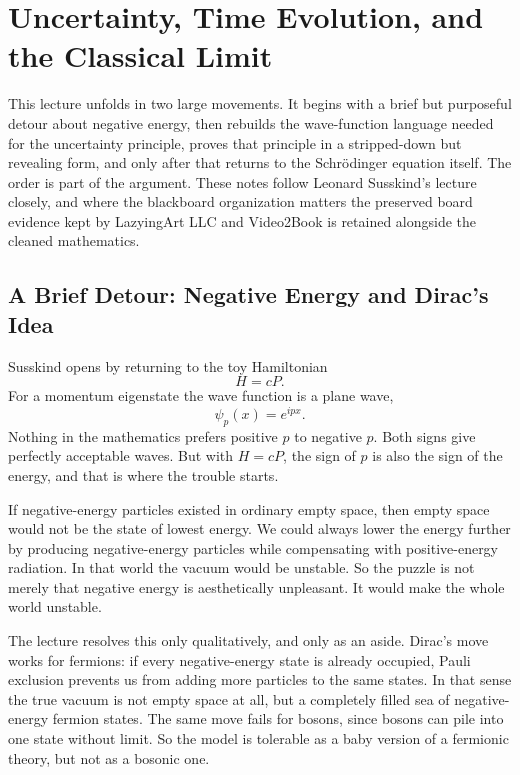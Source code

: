 \chapter{Uncertainty, Time Evolution, and the Classical Limit}

This lecture unfolds in two large movements. It begins with a brief but purposeful detour about negative energy, then rebuilds the wave-function language needed for the uncertainty principle, proves that principle in a stripped-down but revealing form, and only after that returns to the Schr\"odinger equation itself. The order is part of the argument. These notes follow Leonard Susskind's lecture closely, and where the blackboard organization matters the preserved board evidence kept by LazyingArt LLC and Video2Book is retained alongside the cleaned mathematics.

\section{A Brief Detour: Negative Energy and Dirac's Idea}

Susskind opens by returning to the toy Hamiltonian
\begin{equation}
H=cP.
\end{equation}
For a momentum eigenstate the wave function is a plane wave,
\begin{equation}
\psi_p(x)=e^{ipx}.
\end{equation}
Nothing in the mathematics prefers positive \(p\) to negative \(p\). Both signs give perfectly acceptable waves. But with \(H=cP\), the sign of \(p\) is also the sign of the energy, and that is where the trouble starts.

If negative-energy particles existed in ordinary empty space, then empty space would not be the state of lowest energy. We could always lower the energy further by producing negative-energy particles while compensating with positive-energy radiation. In that world the vacuum would be unstable. So the puzzle is not merely that negative energy is aesthetically unpleasant. It would make the whole world unstable.

The lecture resolves this only qualitatively, and only as an aside. Dirac's move works for fermions: if every negative-energy state is already occupied, Pauli exclusion prevents us from adding more particles to the same states. In that sense the true vacuum is not empty space at all, but a completely filled sea of negative-energy fermion states. The same move fails for bosons, since bosons can pile into one state without limit. So the model is tolerable as a baby version of a fermionic theory, but not as a bosonic one.

